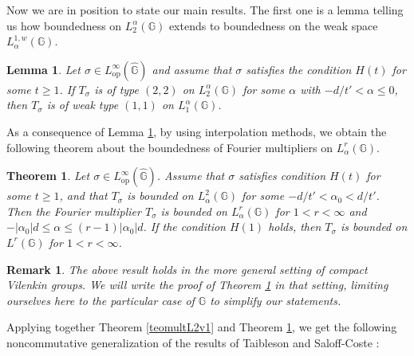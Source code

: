\documentclass[12pt, reqno]{amsart}
\newtheorem{lema}[defi]{Lemma}
\newtheorem{teo}[defi]{Theorem}
\newtheorem{rem}[defi]{Remark}
\newcommand{\1}{\mathds{1}}
\newcommand{\G}{\mathbb{G}}
\begin{document}
Now we are in position to state our main results. The first one is a lemma telling us how boundedness on $L^\alpha_2(\mathbb{G})$ extends to boundedness on the weak space $L_\alpha^{1,w}(\mathbb{G})$.

\begin{lema}\label{LemaH(t)L2alpha}
Let $\sigma \in L^\infty_{\mathrm{op}}(\widehat{\mathbb{G}})$ and assume that $\sigma$ satisfies the condition $H(t)$ for some $t \ge 1$. If $T_\sigma$ is of type $(2,2)$ on $L^\alpha_2(\mathbb{G})$ for some $\alpha$ with $-d/t' < \alpha \le 0$, then $T_\sigma$ is of weak type $(1,1)$ on $L^\alpha_1(\mathbb{G})$.
\end{lema}



As a consequence of Lemma \ref{LemaH(t)L2alpha}, by using interpolation methods, we obtain the following theorem about the boundedness of Fourier multipliers on $L^r_\alpha (\G)$.

\begin{teo}\label{teoL2impliesLr}
Let $\sigma \in L^\infty_{\mathrm{op}}(\widehat{\mathbb{G}})$. Assume that $\sigma$ satisfies condition $H(t)$ for some $t \ge 1$, and that $T_\sigma$ is bounded on $L_\alpha^{2}(\mathbb{G})$ for some $-d/t' < \alpha_0 < d/t'$. Then the Fourier multiplier $T_\sigma$ is bounded on $L_\alpha^r(\mathbb{G})$ for $1<r<\infty$ and $-|\alpha_0|d \le \alpha \le (r-1)|\alpha_0|d$. If the condition $H(1)$ holds, then $T_\sigma$ is bounded on $L^r(\mathbb{G})$ for $1<r<\infty$.
\end{teo}

\begin{rem}
The above result holds in the more general setting of compact Vilenkin groups. We will write the proof of Theorem \ref{teoL2impliesLr} in that setting, limiting ourselves here to the particular case of $\mathbb{G}$ to simplify our statements.
\end{rem}

Applying together Theorem \ref{teomultL2v1} and Theorem \ref{teoL2impliesLr}, we get the following noncommutative generalization of the results of Taibleson \cite{Taibleson1970} and Saloff-Coste \cite{SaloffCoste1986}:
\end{document}
